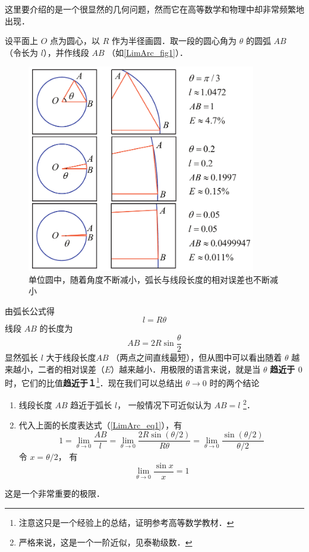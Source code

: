 

这里要介绍的是一个很显然的几何问题，然而它在高等数学和物理中却非常频繁地出现．

设平面上 $O$ 点为圆心，以 $R$ 作为半径画圆．取一段的圆心角为 $\theta $ 的圆弧 $AB$ （令长为 $l$），并作线段 $AB$ （如\autoref{LimArc_fig1}）．

\begin{figure}[ht]
\centering
\includegraphics[width=10cm]{./figures/LimArc.pdf}
\caption{单位圆中，随着角度不断减小，弧长与线段长度的相对误差也不断减小}\label{LimArc_fig1}
\end{figure}

由弧长公式得
\begin{equation} \label{LimArc_eq1}
l = R\theta 
\end{equation}
线段 $AB$ 的长度为
\begin{equation}\label{LimArc_eq2}
AB = 2R\sin \frac{\theta }{2}
\end{equation}
显然弧长 $l$ 大于线段长度$AB$ （两点之间直线最短），但从图中可以看出随着 $\theta $ 越来越小，二者的相对误差（$E$）越来越小．用极限的语言来说，就是当 $\theta $ \textbf{趋近于 $0$ } 时，它们的比值\textbf{趋近于１}\footnote{注意这只是一个经验上的总结，证明参考高等数学教材．}．现在我们可以总结出 $\theta \to 0$ 时的两个结论

\begin{enumerate}
\item 线段长度 $AB$ 趋近于弧长 $l$， 一般情况下可近似认为 $AB = l$ \footnote{严格来说，这是一个一阶近似，见泰勒级数．}． %

\item 代入上面的长度表达式（\autoref{LimArc_eq1}），有
\begin{equation}
1=\lim_{\theta\to 0}\frac{AB}{l} = \lim_{\theta\to 0}\frac{2R\sin ({\theta }/{2})}{R\theta } 
= \lim_{\theta\to 0}\frac{\sin ({\theta }/{2})}{{\theta }/{2}}
\end{equation}
令 $x = \theta/2$， 有
\begin{equation}
\lim_{\theta\to 0}\frac{\sin x}{x} = 1
\end{equation}
\end{enumerate}

这是一个非常重要的极限．










